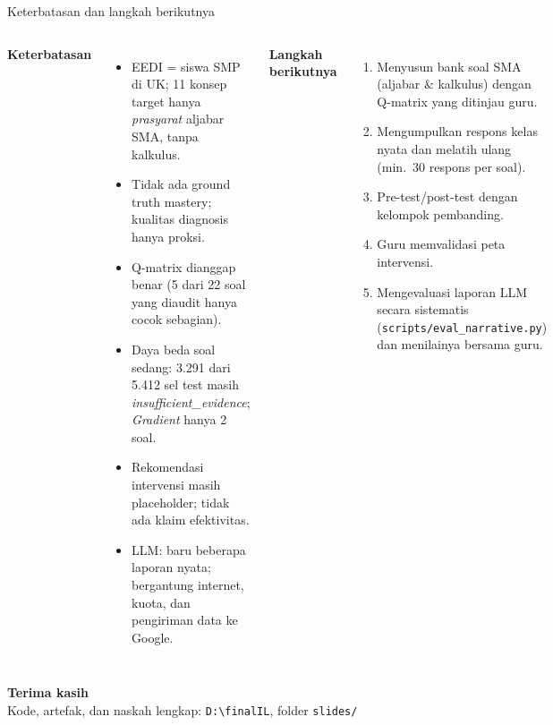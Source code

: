 \documentclass[aspectratio=169,10pt]{beamer}
\begin{document}
\begin{frame}{Keterbatasan dan langkah berikutnya}
  \begin{columns}[T]
    \footnotesize
    \textbf{Keterbatasan}
    \begin{itemize}
      \item EEDI = siswa SMP di UK; 11 konsep target hanya \emph{prasyarat} aljabar SMA, tanpa kalkulus.
      \item Tidak ada ground truth mastery; kualitas diagnosis hanya proksi.
      \item Q-matrix dianggap benar (5 dari 22 soal yang diaudit hanya cocok sebagian).
      \item Daya beda soal sedang: 3.291 dari 5.412 sel test masih \emph{insufficient\_evidence};
            \emph{Gradient} hanya 2 soal.
      \item Rekomendasi intervensi masih placeholder; tidak ada klaim efektivitas.
      \item LLM: baru beberapa laporan nyata; bergantung internet, kuota, dan pengiriman data ke Google.
    \end{itemize}
    \footnotesize
    \textbf{Langkah berikutnya}
    \begin{enumerate}
      \item Menyusun bank soal SMA (aljabar \& kalkulus) dengan Q-matrix yang ditinjau guru.
      \item Mengumpulkan respons kelas nyata dan melatih ulang (min.\ 30 respons per soal).
      \item Pre-test/post-test dengan kelompok pembanding.
      \item Guru memvalidasi peta intervensi.
      \item Mengevaluasi laporan LLM secara sistematis (\texttt{scripts/eval\_narrative.py}) dan menilainya bersama guru.
    \end{enumerate}
  \end{columns}
\end{frame}

\begin{frame}[plain]
  \centering\vfill
  {\Large\bfseries\color{navy} Terima kasih}\\[0.8em]
  {\small\color{midgray}Kode, artefak, dan naskah lengkap: \texttt{D:\textbackslash finalIL}, folder \texttt{slides/}}
  \vfill
\end{frame}
\end{document}
